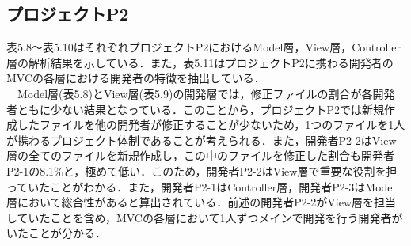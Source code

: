 \documentclass{funthesis}
\begin{document}
\subsection{プロジェクトP2}
表5.8〜表5.10はそれぞれプロジェクトP2におけるModel層，View層，Controller層の解析結果を示している．また，表5.11はプロジェクトP2に携わる開発者のMVCの各層における開発者の特徴を抽出している．
\\　Model層(表5.8)とView層(表5.9)の開発層では，修正ファイルの割合が各開発者ともに少ない結果となっている．このことから，プロジェクトP2では新規作成したファイルを他の開発者が修正することが少ないため，1つのファイルを1人が携わるプロジェクト体制であることが考えられる．また，開発者P2-2はView層の全てのファイルを新規作成し，この中のファイルを修正した割合も開発者P2-1の8.1\%と，極めて低い．このため，開発者P2-2はView層で重要な役割を担っていたことがわかる．また，開発者P2-1はController層，開発者P2-3はModel層において総合性があると算出されている．前述の開発者P2-2がView層を担当していたことを含め，MVCの各層において1人ずつメインで開発を行う開発者がいたことが分かる．
\end{document}
